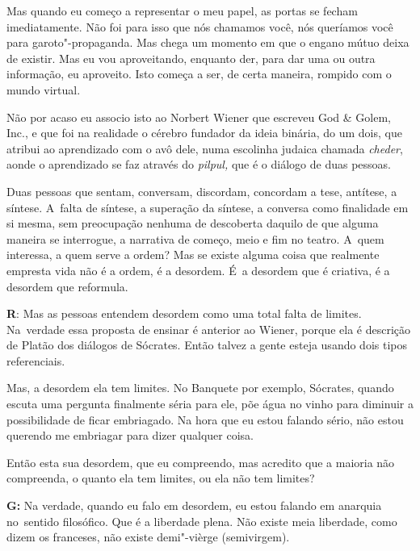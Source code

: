  

Mas quando eu começo a representar o meu papel, as portas se fecham
imediatamente. Não foi para isso que nós chamamos você, nós queríamos
você para garoto"-propaganda. Mas chega um momento em que o engano mútuo
deixa de existir. Mas eu vou aproveitando, enquanto der, para dar uma ou
outra informação, eu aproveito. Isto começa a ser, de certa maneira,
rompido com o mundo virtual.

 

Não por acaso eu associo isto ao Norbert Wiener que escreveu God \&
Golem, Inc., e que foi na realidade o cérebro fundador da ideia binária,
do um dois, que atribui ao aprendizado com o avô dele, numa escolinha
judaica chamada \emph{cheder}, aonde o aprendizado se faz através do
\emph{pilpul,} que é o diálogo de duas pessoas.

 

Duas pessoas que sentam, conversam, discordam, concordam a tese,
antítese, a síntese. A~falta de síntese, a superação da síntese, a
conversa como finalidade em si mesma, sem preocupação nenhuma de
descoberta daquilo de que alguma maneira se interrogue, a narrativa de
começo, meio e fim no teatro. A~quem interessa, a quem serve a ordem?
Mas se existe alguma coisa que realmente empresta vida não é a ordem, é
a desordem. É~a desordem que é criativa, é a desordem que reformula.

 

\textbf{R}: Mas as pessoas entendem desordem como uma total falta de
limites. Na\textbf{}~verdade essa proposta de ensinar é anterior ao
Wiener, porque ela é descrição de Platão dos diálogos de Sócrates. Então
talvez a gente esteja usando dois tipos referenciais.

 

Mas, a desordem ela tem limites. No Banquete por exemplo, Sócrates,
quando escuta uma pergunta finalmente séria para ele, põe água no vinho
para diminuir a possibilidade de ficar embriagado. Na hora que eu estou
falando sério, não estou querendo me embriagar para dizer qualquer
coisa.

 

Então esta sua desordem, que eu compreendo, mas acredito que a maioria
não compreenda, o quanto ela tem limites, ou ela não tem limites?

 

\textbf{G:} Na verdade, quando eu falo em desordem, eu estou falando em
anarquia no\textbf{}~sentido filosófico. Que é a liberdade plena. Não
existe meia liberdade, como dizem os franceses, não existe demi"-vièrge
(semivirgem).

